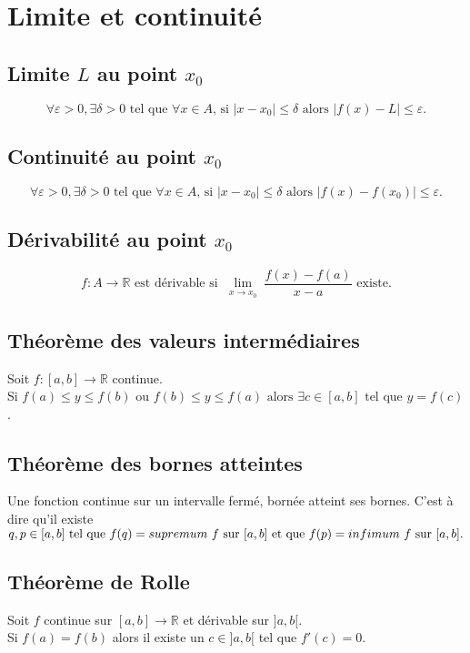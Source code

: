 \section{Limite et continuité}

\subsection{Limite $L$ au point $x_0$}
\[ \forall \varepsilon > 0, \exists \delta > 0 \text{ tel que } \forall x \in A\text{, si }|x - x_0| \leq \delta \text{ alors } |f(x) - L| \leq \varepsilon.\]

\subsection{Continuité au point $x_0$}
\[ \forall \varepsilon > 0, \exists \delta > 0 \text{ tel que } \forall x \in A\text{, si }|x - x_0| \leq \delta \text{ alors } |f(x) - f(x_0)| \leq \varepsilon.\]

\subsection{Dérivabilité au point $x_0$}
\[f : A \rightarrow \mathbb{R} \text{ est dérivable si }\lim_{\substack{x \rightarrow x_0}} \frac{f(x) - f(a)}{x - a} \text{ existe.}\]

\subsection{Théorème des valeurs intermédiaires}
Soit $f : [a,b] \rightarrow \mathbb{R}$ continue.\\
Si $f(a) \leq y \leq f(b)$ ou $f(b) \leq y \leq f(a)\text{ alors }\exists c \in [a,b] \text{ tel que } y = f(c)$.

\subsection{Théorème des bornes atteintes}
Une fonction continue sur un intervalle fermé, bornée atteint ses bornes. C'est à dire qu'il existe $q, p \in [a,b] \text{ tel que } \\
f(q) = supremum\ f\text{ sur } [a,b]\\
\text{ et que } f(p) = infimum\ f \text{ sur } [a,b].$

\subsection{Théorème de Rolle}
Soit $f$ continue sur $ [a,b] \to \mathbb{R}$ et dérivable sur $]a,b[$.\\
Si $f(a) = f(b)$ alors il existe un $c \in ]a,b[$ tel que $f'(c) = 0$.

